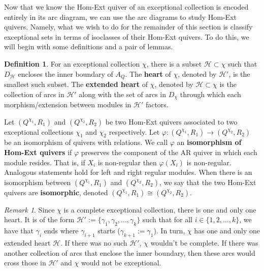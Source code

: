 \documentclass[12pt]{amsart}
\theoremstyle{plain}
\theoremstyle{definition}
\newtheorem{defn}{Definition}[section]
\theoremstyle{remark}
\newtheorem{rem}{Remark}[section]
\begin{document}
Now that we know the Hom-Ext quiver of an exceptional collection is encoded entirely in its arc diagram, we can use the arc diagrams to study Hom-Ext quivers. Namely, what we wish to do for the remainder of this section is classify exceptional sets in terms of {\color{black} isoclasses} of their Hom-Ext quivers. To do this, we will begin with some definitions and a pair of lemmas.

\begin{defn}\label{defn: heart}
For an exceptional collection $\chi$, there is a subset $\mathcal{H} \subset \chi$ such that $D_{\mathcal{H}}$ encloses the inner boundary of $A_Q$. The \textbf{heart} of $\chi$, denoted by $\mathcal{H}'$, is the smallest such subset. The \textbf{extended heart} of $\chi$, denoted by $\mathcal{H}\subset \chi$ is the collection of arcs in $\mathcal{H}'$ along with the set of arcs in $D_{\chi}$ through which each morphism/extension between modules in $\mathcal{H'}$ factors. 

{\color{black} Let $(Q^{\chi_1},R_1)$ and $(Q^{\chi_2},R_2)$ be two Hom-Ext quivers associated to two exceptional collections $\chi_1$ and $\chi_2$ respectively. Let $\varphi: (Q^{\chi_1},R_1) \rightarrow (Q^{\chi_2},R_2)$ be an isomorphism of quivers with relations. We call $\varphi$ an \textbf{isomorphism of Hom-Ext quivers} if $\varphi$ preserves the component of the AR quiver in which each module resides. That is, if $X_i$ is non-regular then $\varphi(X_i)$ is non-regular. Analogous statements hold for left and right regular modules. When there is an isomorphism between $(Q^{\chi_1},R_1)$ and $(Q^{\chi_2},R_2)$, we say that the two Hom-Ext quivers are \textbf{isomorphic}, denoted $(Q^{\chi_1},R_1) \cong (Q^{\chi_2},R_2)$. }
\end{defn}

\begin{rem}\label{rem: heart well-defined}
Since $\chi$ is a complete  exceptional collection, there is one and only one heart. It is of the form $\mathcal{H}' := \{ \gamma_1, \gamma_2, \dots, \gamma_k\}$ such that for all $i \in \{1,2,\dots,k\}$, we have that $\gamma_i$ ends where $\gamma_{i+1}$ starts ($\gamma_{k+1} := \gamma_1$). In turn, $\chi$ has one and only one extended heart $\mathcal{H}$. If there was no such $\mathcal{H}'$, $\chi$ wouldn't be complete. If there was another collection of arcs that enclose the inner boundary, then these arcs would cross those in $\mathcal{H}'$ and $\chi$ would not be exceptional. 
\end{rem}
\end{document}
